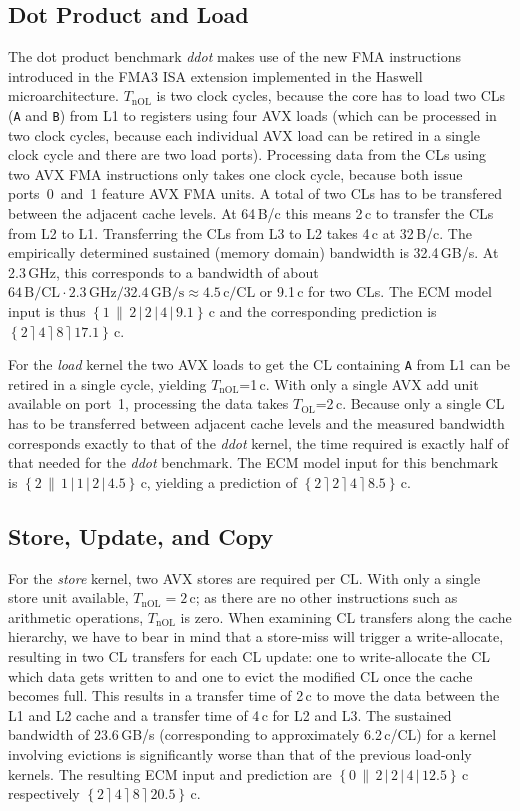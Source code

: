 \documentclass{llncs}
\newcommand{\epsep}{\rceil}
\newcommand{\olsep}{\|}
\newcommand{\nolsep}{|}
\newcommand{\ecmspace}{\,}
\newcommand{\ecm}[6]{\mbox{$\left\{{#1}\ecmspace\olsep\ecmspace {#2}\ecmspace\nolsep\ecmspace {#3}\ecmspace\nolsep\ecmspace {#4}\ecmspace\nolsep\ecmspace {#5}\right\}\ecmspace{#6}$}}
\newcommand{\ecmp}[5]{\mbox{$\left\{{#1}\ecmspace\epsep\ecmspace {#2}\ecmspace\epsep\ecmspace {#3}\ecmspace\epsep\ecmspace {#4}\right\}\ecmspace{#5}$}}
\begin{document}
\subsection{Dot Product and Load}
The dot product benchmark \textit{ddot} makes use of the new \ac{FMA}
instructions introduced in the FMA3 ISA extension implemented in the
Haswell microarchitecture.  $T_\mathrm{nOL}$ is two clock cycles, because the
core has to load two CLs (\texttt{A} and \texttt{B}) from L1 to registers using
four AVX loads (which can be processed in two clock cycles, because each
individual AVX load can be retired in a single clock cycle and there are two
load ports). Processing data from the CLs using two AVX \ac{FMA} instructions
only takes one clock cycle, because both issue ports~0~and~1 feature AVX FMA
units. A total of two CLs has to be transfered between the adjacent cache
levels. At 64\,B/c this means 2\,c to transfer the CLs from L2 to L1.
Transferring the CLs from L3 to L2 takes 4\,c at 32\,B/c. The empirically
determined sustained (memory domain) bandwidth is 32.4\,GB/s. At 2.3\,GHz, this
corresponds to a bandwidth of about
$64\,\mathrm{B/CL} \cdot 2.3\,\mathrm{GHz} / 32.4\,\mathrm{GB/s} \approx
4.5\,\mathrm{c/CL}$
or 9.1\,c for two CLs. The
ECM model input is thus \ecm{1}{2}{2}{4}{9.1}{\mathrm{c}} and the
corresponding prediction is \ecmp{2}{4}{8}{17.1}{\mathrm{c}}.

For the \textit{load} kernel the two AVX loads to get the CL containing
\texttt{A} from L1 can be retired in a single cycle, yielding
$T_\mathrm{nOL}$=1\,c. With only a single AVX add unit available on port~1,
processing the data takes $T_\mathrm{OL}$=2\,c.  Because only a single CL has
to be transferred between adjacent cache levels and the measured bandwidth
corresponds exactly to that of the \textit{ddot} kernel, the time required is
exactly half of that needed for the \textit{ddot} benchmark.  The ECM model
input for this benchmark is \ecm{2}{1}{1}{2}{4.5}{\mathrm{c}}, yielding a
prediction of \ecmp{2}{2}{4}{8.5}{\mathrm{c}}.

\subsection{Store, Update, and Copy}

For the \textit{store} kernel, two AVX stores are required per CL. With only a
single store unit available, $T_\mathrm{nOL} = 2$\,c; as there are no other
instructions such as arithmetic operations, $T_\mathrm{nOL}$ is zero. When
examining CL transfers along the cache hierarchy, we have to bear in mind that
a store-miss will trigger a write-allocate, resulting in two CL transfers for
each CL update: one to write-allocate the CL which data gets written to and one
to evict the modified CL once the cache becomes full.  This results in a
transfer time of 2\,c to move the data between the L1 and L2 cache and a
transfer time of 4\,c for L2 and L3. The sustained bandwidth of 23.6\,GB/s
(corresponding to approximately 6.2\,c/CL) for a kernel involving evictions is
significantly worse than that of the previous load-only kernels. The resulting
ECM input and prediction are \ecm{0}{2}{2}{4}{12.5}{\mathrm{c}} respectively
\ecmp{2}{4}{8}{20.5}{\mathrm{c}}.
\end{document}
